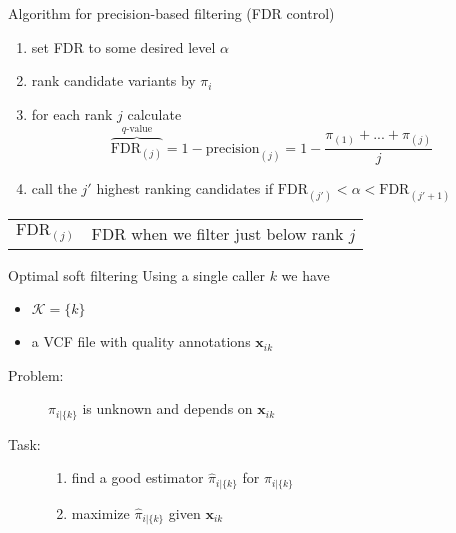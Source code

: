 \documentclass{beamer} %
\begin{document}
\begin{frame}{Algorithm for precision-based filtering (FDR control)}

\begin{enumerate}
\item set FDR to some desired level \(\alpha\)
\item rank candidate variants by \(\pi_i\) 
\item for each rank \(j\) calculate
\begin{equation*}
\overbrace{\text{FDR}_{(j)}}^{q\text{-value}} = 1 - \text{precision}_{(j)} = 1 -
\frac{\pi_{(1)} + ... + \pi_{(j)}}{j}
\end{equation*}
\item call the \(j'\) highest ranking candidates if \(\text{FDR}_{(j')} <
\alpha < \text{FDR}_{(j'+1)}\)

\end{enumerate}

\bigskip
{\footnotesize
\begin{tabular}{cl}
\hline
\(\text{FDR}_{(j)}\) & FDR when we filter just below rank \(j\) \\
\end{tabular}
}
\end{frame}


\begin{frame}{Optimal soft filtering}
Using a single caller \(k\) we have
\begin{itemize}
\item \(\mathcal{K}=\{k\}\)
\item a VCF file with quality annotations \(\mathbf{x}_{ik}\)
\end{itemize}
\bigskip
\begin{description}
\item[Problem:] \(\pi_{i | \{k\}}\) is unknown and depends on \(\mathbf{x}_{ik}\)
\item[Task:]
\begin{enumerate}
\item find a good estimator \(\hat{\pi}_{i | \{k\}}\) for \(\pi_{i | \{k\}}\) \\
\item maximize \(\hat{\pi}_{i | \{k\}}\) given \(\mathbf{x}_{ik}\)
\end{enumerate}

\end{description}
\end{frame}
\end{document}
